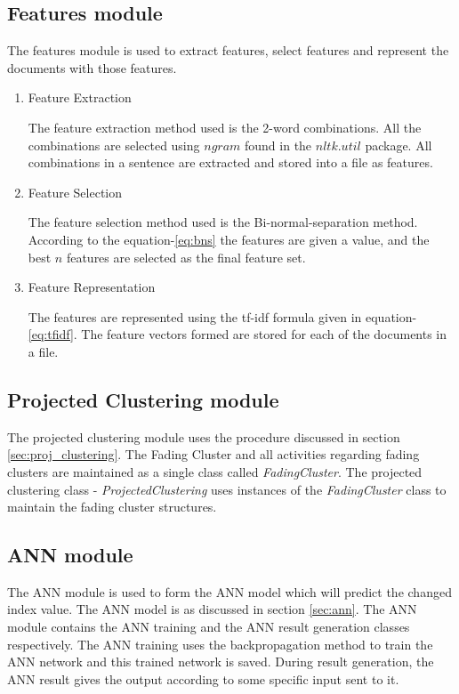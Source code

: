 \documentclass[a4paper,12bp]{report}
\begin{document}
\subsection{Features module}
\label{subsec:features}
The features module is used to extract features, select features and represent the documents with those features. 

\begin{enumerate}
\item Feature Extraction

The feature extraction method used is the 2-word combinations. All the combinations are selected using $ngram$ found in the $nltk.util$ package. All combinations in a sentence are extracted and stored into a file as features. 

\item Feature Selection

The feature selection method used is the Bi-normal-separation method. According to the equation-\ref{eq:bns} the features are given a value, and the best $n$ features are selected as the final feature set. 

\item Feature Representation

The features are represented using the tf-idf formula given in equation-\ref{eq:tfidf}. The feature vectors formed are stored for each of the documents in a file. 
\end{enumerate}

\subsection{Projected Clustering module}
\label{subsec:projected}
The projected clustering module uses the procedure discussed in section \ref{sec:proj_clustering}. The Fading Cluster and all activities regarding fading clusters are maintained as a single class called \textit{FadingCluster}. The projected clustering class - \textit{ProjectedClustering} uses instances of the \textit{FadingCluster} class to maintain the fading cluster structures. 

\subsection{ANN module}
\label{subsec:ann}
The ANN module is used to form the ANN model which will predict the changed index value. The ANN model is as discussed in section \ref{sec:ann}. The ANN module contains the ANN training and the ANN result generation classes respectively. The ANN training uses the backpropagation method to train the ANN network and this trained network is saved. During result generation, the ANN result gives the output according to some specific input sent to it. 
\end{document}
